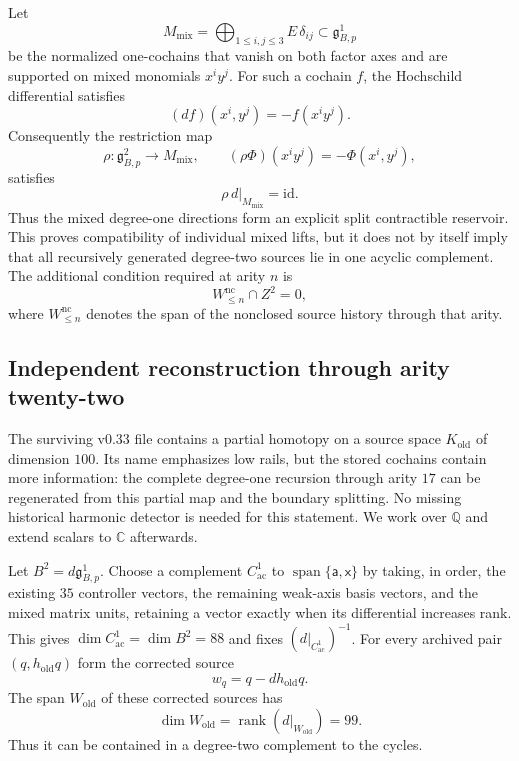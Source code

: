 \documentclass[11pt]{amsart}
\newcommand{\Span}{\operatorname{span}}
\newcommand{\rank}{\operatorname{rank}}
\newcommand{\C}{\mathbb C}
\newcommand{\Q}{\mathbb Q}
\newcommand{\ghoch}{\mathfrak g}
\begin{document}
Let
\[
M_{\mathrm{mix}}
=
\bigoplus_{1\le i,j\le3}E\,\delta_{ij}
\subset \ghoch^1_{B,p}
\]
be the normalized one-cochains that vanish on both factor axes and are supported on mixed monomials $x^iy^j$.  For such a cochain $f$, the Hochschild differential satisfies
\[
(d f)(x^i,y^j)=-f(x^iy^j).
\]
Consequently the restriction map
\[
\rho:\ghoch^2_{B,p}\longrightarrow M_{\mathrm{mix}},
\qquad
(\rho\Phi)(x^iy^j)=-\Phi(x^i,y^j),
\]
satisfies
\begin{equation}\label{eq:split-mixed}
\boxed{\rho\,d|_{M_{\mathrm{mix}}}=\mathrm{id}.}
\end{equation}
Thus the mixed degree-one directions form an explicit split contractible reservoir.  This proves compatibility of individual mixed lifts, but it does not by itself imply that all recursively generated degree-two sources lie in one acyclic complement.  The additional condition required at arity $n$ is
\[
W_{\le n}^{\mathrm{nc}}\cap Z^2=0,
\]
where $W_{\le n}^{\mathrm{nc}}$ denotes the span of the nonclosed source history through that arity.

\subsection{Independent reconstruction through arity twenty-two}\label{subsec:independent-transfer}

The surviving v0.33 file contains a partial homotopy on a source space
$K_{\mathrm{old}}$ of dimension $100$. Its name emphasizes low rails, but the
stored cochains contain more information: the complete degree-one recursion
through arity $17$ can be regenerated from this partial map and the boundary
splitting. No missing historical harmonic detector is needed for this statement.
We work over $\Q$ and extend scalars to $\C$ afterwards.

Let $B^2=d\ghoch^1_{B,p}$. Choose a complement $C^1_{\mathrm{ac}}$ to
$\Span\{\mathsf a,\mathsf x\}$ by taking, in order, the existing $35$ controller
vectors, the remaining weak-axis basis vectors, and the mixed matrix units,
retaining a vector exactly when its differential increases rank. This gives
$\dim C^1_{\mathrm{ac}}=\dim B^2=88$ and fixes $(d|_{C^1_{\mathrm{ac}}})^{-1}$.
For every archived pair $(q,h_{\mathrm{old}}q)$ form the corrected source
\[
w_q=q-dh_{\mathrm{old}}q.
\]
The span $W_{\mathrm{old}}$ of these corrected sources has
\[
\dim W_{\mathrm{old}}=\rank(d|_{W_{\mathrm{old}}})=99.
\]
Thus it can be contained in a degree-two complement to the cycles.
\end{document}
